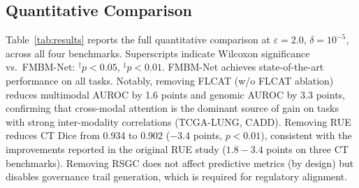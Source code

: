 \documentclass[a4paper,fleqn]{cas-dc}
\begin{document}
\subsection{Quantitative Comparison}

Table~\ref{tab:results} reports the full quantitative comparison at
$\varepsilon\!=\!2.0$, $\delta\!=\!10^{-5}$, across all four benchmarks.
Superscripts indicate Wilcoxon significance vs.\ FMBM-Net:
$^\dagger p\!<\!0.05$, $^\ddagger p\!<\!0.01$. FMBM-Net achieves
state-of-the-art performance on all tasks. Notably, removing FLCAT
(w/o FLCAT ablation) reduces multimodal AUROC by 1.6 points
and genomic AUROC by 3.3 points, confirming that cross-modal attention is the
dominant source of gain on tasks with strong inter-modality correlations
(TCGA-LUNG, CADD). Removing RUE reduces CT Dice from 0.934 to 0.902
($-3.4$ points, $p\!<\!0.01$), consistent with the improvements reported in
the original RUE study \citep{rue_ct_2025} ($1.8\!-\!3.4$ points on three CT
benchmarks). Removing RSGC does not affect predictive metrics (by design) but
disables governance trail generation, which is required for regulatory
alignment.
\end{document}
